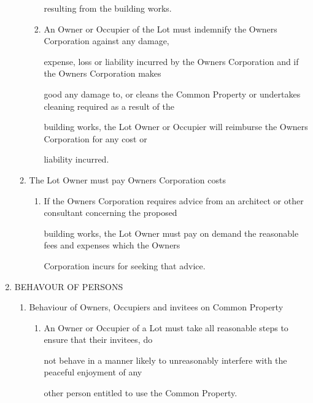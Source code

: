 \documentclass{article}
\begin{document}
\begin{enumerate}[label=\arabic*.]
\begin{enumerate}[label=\arabic{enumi}.\arabic*.]
\begin{enumerate}[label=(\arabic*)]
{\fontsize{10.02}{1}resulting from the building works. }

\item {\fontsize{9.962}{1} An Owner or Occupier of the Lot must indemnify the Owners Corporation against any damage, }

{\fontsize{10.02}{1}expense, loss or liability incurred by the Owners Corporation and if the Owners Corporation makes }

{\fontsize{10.02}{1}good any damage to, or cleans the Common Property or undertakes cleaning required as a result of the }

{\fontsize{10.02}{1}building works, the Lot Owner or Occupier will reimburse the Owners Corporation for any cost or }

{\fontsize{10.02}{1}liability incurred. }

\end{enumerate}
\item {\fontsize{9.99}{1} The Lot Owner must pay Owners Corporation costs }

\begin{enumerate}[label=(\arabic*)]
\item {\fontsize{9.962}{1} If the Owners Corporation requires advice from an architect or other consultant concerning the proposed }

{\fontsize{10.02}{1}building works, the Lot Owner must pay on demand the reasonable fees and expenses which the Owners }

{\fontsize{10.02}{1}Corporation incurs for seeking that advice. }

\end{enumerate}
\end{enumerate}
\item {\fontsize{9.99}{1} BEHAVOUR OF PERSONS }

\begin{enumerate}[label=\arabic{enumi}.\arabic*.]
\item {\fontsize{9.99}{1} Behaviour of Owners, Occupiers and invitees on Common Property }

\begin{enumerate}[label=(\arabic*)]
\item {\fontsize{9.962}{1} An Owner or Occupier of a Lot must take all reasonable steps to ensure that their invitees, do }

{\fontsize{10.02}{1}not behave in a manner likely to unreasonably interfere with the peaceful enjoyment of any }

{\fontsize{10.02}{1}other person entitled to use the Common Property. }


\end{enumerate}
\end{enumerate}
\end{enumerate}
\end{document}
